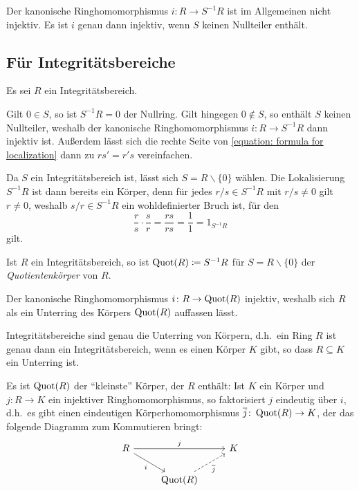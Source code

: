 \begin{warning}
  Der kanonische Ringhomomorphismus $i \colon R \to S^{-1} R$ ist im Allgemeinen nicht injektiv.
  Es ist $i$ genau dann injektiv, wenn $S$ keinen Nullteiler enthält.
\end{warning}



\subsection{Für Integritätsbereiche}

Es sei $R$ ein Integritätsbereich.

Gilt $0 \in S$, so ist $S^{-1} R = 0$ der Nullring.
Gilt hingegen $0 \notin S$, so enthält $S$ keinen Nullteiler, weshalb der kanonische Ringhomomorphismus $i \colon R \to S^{-1} R$ dann injektiv ist.
Außerdem lässt sich die rechte Seite von \eqref{equation: formula for localization} dann zu $rs' = r's$ vereinfachen.

Da $S$ ein Integritätsbereich ist, lässt sich $S = R \smallsetminus \{0\}$ wählen.
Die Lokalisierung $S^{-1} R$ ist dann bereits ein Körper, denn für jedes $r/s \in S^{-1} R$ mit $r/s \neq 0$ gilt $r \neq 0$, weshalb $s/r \in S^{-1} R$ ein wohldefinierter Bruch ist, für den
\[
        \frac{r}{s}
  \cdot \frac{s}{r}
  =     \frac{rs}{rs}
  =     \frac{1}{1}
  =     1_{S^{-1} R}
\]
gilt.

\begin{definition}
  Ist $R$ ein Integritätsbereich, so ist $\operatorname{Quot}(R) \coloneqq S^{-1} R$ für $S = R \smallsetminus \{0\}$ der \emph{Quotientenkörper} von $R$.
\end{definition}

Der kanonische Ringhomomorphismus $i \colon R \to \operatorname{Quot}(R)$ injektiv, weshalb sich $R$ als ein Unterring des Körpers $\operatorname{Quot}(R)$ auffassen lässt.

\begin{corollary}
  Integritätsbereiche sind genau die Unterring von Körpern, d.h.\ ein Ring $R$ ist genau dann ein Integritätsbereich, wenn es einen Körper $K$ gibt, so dass $R \subseteq K$ ein Unterring ist.
\end{corollary}

Es ist $\operatorname{Quot}(R)$ der \enquote{kleinste} Körper, der $R$ enthält:
Ist $K$ ein Körper und $j \colon R \to K$ ein injektiver Ringhomomorphismus, so faktorisiert $j$ eindeutig über $i$, d.h.\ es gibt einen eindeutigen Körperhomomorphismus $\overline{j} \colon \operatorname{Quot}(R) \to K$, der das folgende Diagramm zum Kommutieren bringt:
\[
  \begin{tikzcd}
      R
      \arrow{rr}[above]{j}
      \arrow{dr}[below left]{i}
    & {}
    & K
    \\
      {}
    & \Quot{R}
      \arrow[dashed]{ur}[below right]{\induced{j}}
    & {}
  \end{tikzcd}
\]

